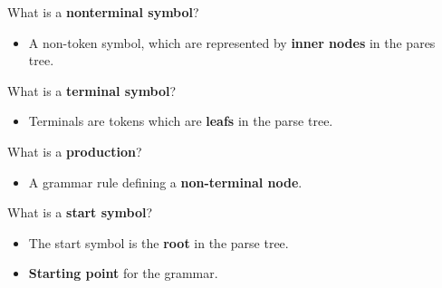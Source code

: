 \documentclass[11pt]{beamer}
\begin{document}
\begin{frame}

\begin{block}{What is a \textbf{nonterminal symbol}?}
\begin{itemize}
\item A non-token symbol, which are represented by \textbf{inner nodes} in the pares tree.
\end{itemize}
\end{block}

\begin{block}{What is a \textbf{terminal symbol}?}
\begin{itemize}
\item Terminals are tokens which are \textbf{leafs} in the parse tree.
\end{itemize}
\end{block}

\begin{block}{What is a \textbf{production}?}
\begin{itemize}
\item A grammar rule defining a \textbf{non-terminal node}.
\end{itemize}
\end{block}

\begin{block}{What is a \textbf{start symbol}?}
\begin{itemize}
\item The start symbol is the \textbf{root} in the parse tree.
\item \textbf{Starting point} for the grammar.
\end{itemize}
\end{block}

\end{frame}
\end{document}
